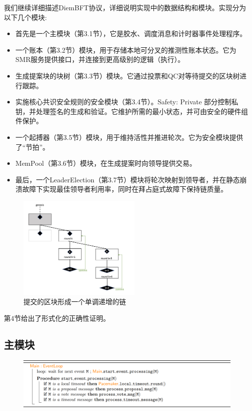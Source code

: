我们继续详细描述DiemBFT协议，详细说明实现中的数据结构和模块。实现分为以下几个模块:
\begin{itemize}
    \item 首先是一个主模块（第3.1节），它是胶水、调度消息和计时器事件处理程序。
    \item 一个账本（第3.2节）模块，用于存储本地可分叉的推测性账本状态。它为SMR服务提供接口，并连接到更高级别的逻辑（执行）。
    \item 生成提案块的块树（第3.3节）模块。它通过投票和QC对等待提交的区块树进行跟踪。
    \item 实施核心共识安全规则的安全模块（第3.4节）。Safety: Private 部分控制私钥，并处理签名的生成和验证。它维护所需的最小状态，并可由安全的硬件组件保护。
    \item 一个起搏器（第3.5节）模块，用于维持活性并推进轮次。它为安全模块提供了“节拍”。
    \item MemPool（第3.6节）模块，在生成提案时向领导提供交易。
    \item 最后，一个LeaderElection（第3.7节）模块将轮次映射到领导者，并在静态崩溃故障下实现最佳领导者利用率，同时在拜占庭式故障下保持链质量。
\end{itemize}

\begin{figure}[htbp]
    \centering
    \includegraphics[width=6cm]{figures/image3.jpg}
    \caption{提交的区块形成一个单调递增的链}
    \label{image3}
\end{figure}

第4节给出了形式化的正确性证明。

\subsection{主模块}

\begin{figure}[htbp]
    \centering
    \includegraphics[width=12cm]{figures/code1.png}
\end{figure}

